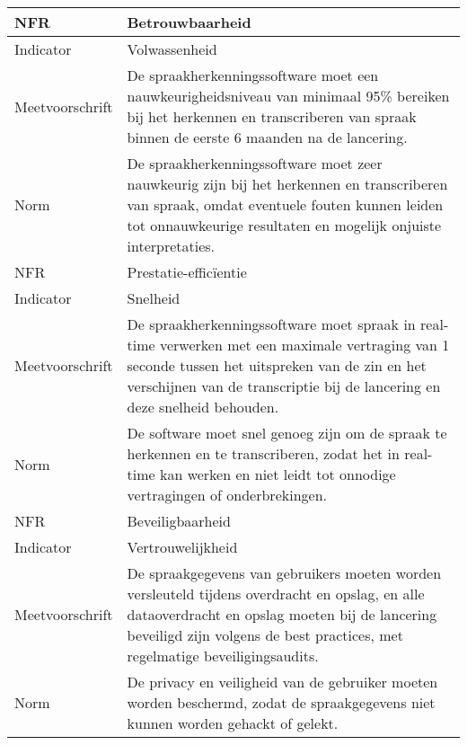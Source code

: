 \begin{center}
    \begin{tabular}{ |p{3cm}|p{11.5cm}| }
        \hline
        NFR & Betrouwbaarheid  \\
        \hline
        Indicator & Volwassenheid \\
        \hline
        Meetvoorschrift & De spraakherkenningssoftware moet een nauwkeurigheidsniveau van minimaal 95\% bereiken bij het herkennen en transcriberen van spraak binnen de eerste 6 maanden na de lancering.  \\
        \hline
        Norm & De spraakherkenningssoftware moet zeer nauwkeurig zijn bij het herkennen en transcriberen van spraak, omdat eventuele fouten kunnen leiden tot onnauwkeurige resultaten en mogelijk onjuiste interpretaties. \\
        \hline\hline
        NFR & Prestatie-efficïentie \\
        \hline
        Indicator & Snelheid \\
        \hline
        Meetvoorschrift & De spraakherkenningssoftware moet spraak in real-time verwerken met een maximale vertraging van 1 seconde tussen het uitspreken van de zin en het verschijnen van de transcriptie bij de lancering en deze snelheid behouden. \\
        \hline
        Norm & De software moet snel genoeg zijn om de spraak te herkennen en te transcriberen, zodat het in real-time kan werken en niet leidt tot onnodige vertragingen of onderbrekingen. \\
        \hline\hline
        NFR & Beveiligbaarheid  \\
        \hline
        Indicator & Vertrouwelijkheid \\
        \hline
        Meetvoorschrift & De spraakgegevens van gebruikers moeten worden versleuteld tijdens overdracht en opslag, en alle dataoverdracht en opslag moeten bij de lancering beveiligd zijn volgens de best practices, met regelmatige beveiligingsaudits. \\
        \hline
        Norm & De privacy en veiligheid van de gebruiker moeten worden beschermd, zodat de spraakgegevens niet kunnen worden gehackt of gelekt. \\
        \hline
    \end{tabular}
\end{center}

\subsection{}%

